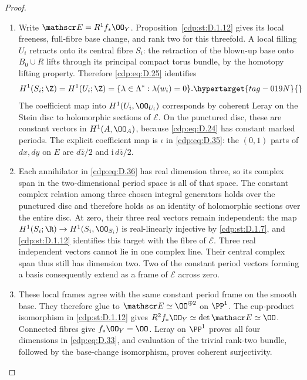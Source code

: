 \begin{proof}

\begin{enumerate}[leftmargin=*]
\item Write $\mathscr E=R^1f_*\OO_Y$. Proposition~\ref{cdp:st:D.1.12} gives its
local freeness, full-fibre base change, and rank two for this
threefold. A local filling $U_i$ retracts onto its central
fibre $S_i$: the retraction of the blown-up base onto
$B_0\cup R$ lifts through its principal compact torus
bundle, by the homotopy lifting property. Therefore \eqref{cdp:eq:D.25}
identifies
\begin{equation}
 H^1(S_i;\Z)=H^1(U_i;\Z)
          =\{\lambda\in\Lambda^*:\lambda(w_i)=0\}.
\hypertarget{tag-019N}{}\label{cdp:eq:D.36}
\end{equation}
The coefficient map into $H^1(U_i,\OO_{U_i})$
corresponds by coherent Leray on the Stein disc to
holomorphic sections of $\mathscr E$. On the punctured
disc, these are constant vectors in $H^1(A,\OO_A)$,
because \eqref{cdp:eq:D.24} has constant marked periods. The explicit
coefficient map is $\iota$ in \eqref{cdp:eq:D.35}: the $(0,1)$ parts
of $dx,dy$ on $E$ are $d\bar z/2$ and
$\mathrm i\,d\bar z/2$.

\item Each annihilator in \eqref{cdp:eq:D.36} has real dimension three, so
its complex span in the two-dimensional period space is
all of that space. The constant complex relation among
three chosen integral generators holds over the
punctured disc and therefore holds as an identity of
holomorphic sections over the entire disc. At zero,
their three real vectors remain independent: the map
$H^1(S_i;\R)\to H^1(S_i,\OO_{S_i})$ is real-linearly
injective by \ref{cdp:st:D.1.7}, and \ref{cdp:st:D.1.12} identifies this target
with the fibre of $\mathscr E$. Three real independent
vectors cannot lie in one complex line. Their central
complex span thus still has dimension two. Two of the
constant period vectors forming a basis consequently
extend as a frame of $\mathscr E$ across zero.

\item These local frames agree with the same constant period
frame on the smooth base. They therefore glue to
$\mathscr E\simeq\OO^{\oplus2}$ on $\PP^1$.
The cup-product isomorphism in \ref{cdp:st:D.1.12} gives
$R^2f_*\OO_Y\simeq\det\mathscr E\simeq\OO$.
Connected fibres give $f_*\OO_Y=\OO$. Leray on $\PP^1$
proves all four dimensions in \eqref{cdp:eq:D.33}, and evaluation
of the trivial rank-two bundle, followed by the
base-change isomorphism, proves coherent surjectivity.


\end{enumerate}
\end{proof}

